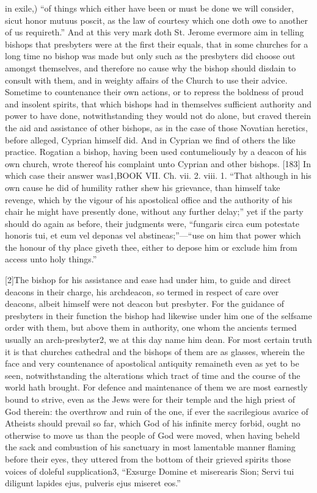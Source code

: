 in exile,) “of things which either have been or must be done we will consider, sicut honor mutuus poscit, as the law of courtesy which one doth owe to another of us requireth.” And at this very mark doth St. Jerome evermore aim in telling bishops that presbyters were at the first their equals, that in some churches for a long time no bishop was made but only such as the presbyters did choose out amongst themselves, and therefore no cause why the bishop should disdain to consult with them, and in weighty affairs of the Church to use their advice. Sometime to countenance their own actions, or to repress the boldness of proud and insolent spirits, that which bishops had in themselves sufficient authority and power to have done, notwithstanding they would not do alone, but craved therein the aid and assistance of other bishops, as in the case of those Novatian heretics, before alleged, Cyprian himself did. And in Cyprian we find of others the like practice. Rogatian a bishop, having been used contumeliously by a deacon of his own church, wrote thereof his complaint unto Cyprian and other bishops. [183] In which case their answer was1,BOOK VII. Ch. vii. 2. viii. 1. “That although in his own cause he did of humility rather shew his grievance, than himself take revenge, which by the vigour of his apostolical office and the authority of his chair he might have presently done, without any further delay;” yet if the party should do again as before, their judgments were, “fungaris circa eum potestate honoris tui, et eum vel deponas vel abstineas;”—“use on him that power which the honour of thy place giveth thee, either to depose him or exclude him from access unto holy things.”

[2]The bishop for his assistance and ease had under him, to guide and direct deacons in their charge, his archdeacon, so termed in respect of care over deacons, albeit himself were not deacon but presbyter. For the guidance of presbyters in their function the bishop had likewise under him one of the selfsame order with them, but above them in authority, one whom the ancients termed usually an arch-presbyter2, we at this day name him dean. For most certain truth it is that churches cathedral and the bishops of them are as glasses, wherein the face and very countenance of apostolical antiquity remaineth even as yet to be seen, notwithstanding the alterations which tract of time and the course of the world hath brought. For defence and maintenance of them we are most earnestly bound to strive, even as the Jews were for their temple and the high priest of God therein: the overthrow and ruin of the one, if ever the sacrilegious avarice of Atheists should prevail so far, which God of his infinite mercy forbid, ought no otherwise to move us than the people of God were moved, when having beheld the sack and combustion of his sanctuary in most lamentable manner flaming before their eyes, they uttered from the bottom of their grieved spirits those voices of doleful supplication3, “Exsurge Domine et miserearis Sion; Servi tui diligunt lapides ejus, pulveris ejus miseret eos.”

